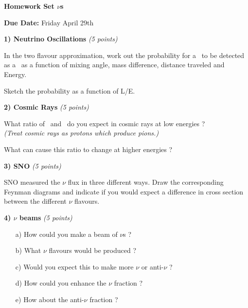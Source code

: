


\thispagestyle{fancy}






\begin{center}
{\huge \textbf{Homework Set $\nu$s }}
\large

{\textbf{ Due Date:} Friday April 29th  } 
\end{center}

{\large

\textbf{1) Neutrino Oscillations } \hfill \textit{(5 points)}

In the two flavour approximation, work out the probability for a \nue\ to be detected as a \numu\ as a function of mixing angle, mass difference, distance traveled and Energy. 

Sketch the probability as a function of L/E. 

\vspace*{0.25in}



\textbf{2) Cosmic Rays } \hfill \textit{(5 points)}

What ratio of \nue\ and \numu\ do you expect in cosmic rays at low energies ?\\
\textit{(Treat cosmic rays as protons which produce pions.) }

What can cause this ratio to change at higher energies ?

\vspace*{0.25in}

\textbf{3) SNO } \hfill \textit{(5 points)}

SNO measured the $\nu$ flux in three different ways.
Draw the corresponding Feynman diagrams and indicate if you would expect a difference in cross section between the different $\nu$ flavours. 

\vspace*{0.25in}

\textbf{4) $\nu$ beams } \hfill \textit{(5 points)}

\begin{itemize}
\item[a)]How could you make a beam of $\nu$s ? 
\item[b)]What $\nu$ flavours would be produced ? 
\item[c)]Would you expect this to make more $\nu$ or anti-$\nu$ ? 
\item[d)]How could you enhance the $\nu$ fraction ? 
\item[e)]How about the  anti-$\nu$ fraction ?
\end{itemize}

}

